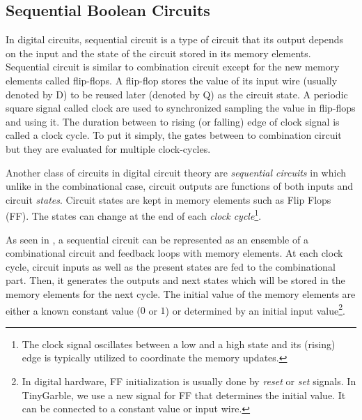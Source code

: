 \subsection{Sequential Boolean Circuits}
In digital circuits, sequential circuit is a type of circuit that its output depends on the input and the state of the circuit stored in its memory elements.
Sequential circuit is similar to combination circuit except for the new memory elements called flip-flops.
A flip-flop stores the value of its input wire (usually denoted by D) to be reused later (denoted by Q) as the circuit state.
A periodic square signal called clock are used to synchronized sampling the value in flip-flops and using it.
The duration between to rising (or falling) edge of clock signal is called a clock cycle.
To put it simply, the gates between to combination circuit but they are evaluated for multiple clock-cycles.

Another class of circuits in digital circuit theory are \emph{sequential circuits} in which unlike in the combinational case, circuit outputs are functions of both inputs and circuit \emph{states}.
Circuit states are kept in memory elements such as Flip Flops (FF).
The states can change at the end of each \emph{clock cycle}\footnote{The clock signal oscillates between a low and a high state and its (rising) edge is typically utilized to coordinate the memory updates.}.

As seen in , a sequential circuit can be represented as an ensemble of a combinational circuit and feedback loops with memory elements.
At each clock cycle, circuit inputs as well as the present states are fed to the combinational part.
Then, it generates the outputs and next states which will be stored in the memory elements for the next cycle.
The initial value of the memory elements are either a known constant value ($0$ or $1$) or determined by an initial input value\footnote{In digital hardware, FF initialization is usually done by \emph{reset} or \emph{set} signals. In TinyGarble, we use a new signal for FF that determines the initial value. It can be connected to a constant value or input wire.}.
